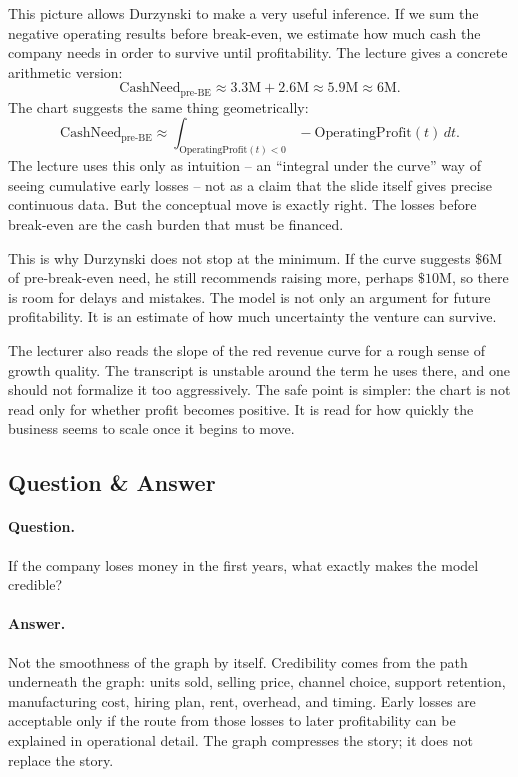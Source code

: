 This picture allows Durzynski to make a very useful inference. If we sum the negative operating results before break-even, we estimate how much cash the company needs in order to survive until profitability. The lecture gives a concrete arithmetic version:
\begin{equation}
\mathrm{CashNeed}_{\mathrm{pre\mbox{-}BE}} \approx 3.3\text{M} + 2.6\text{M}
\approx 5.9\text{M} \approx 6\text{M}.
\end{equation}
The chart suggests the same thing geometrically:
\begin{equation}
\mathrm{CashNeed}_{\mathrm{pre\mbox{-}BE}}
\approx
\int_{\mathrm{OperatingProfit}(t)<0}
-\mathrm{OperatingProfit}(t)\,dt.
\end{equation}
The lecture uses this only as intuition -- an ``integral under the curve'' way of seeing cumulative early losses -- not as a claim that the slide itself gives precise continuous data. But the conceptual move is exactly right. The losses before break-even are the cash burden that must be financed.

This is why Durzynski does not stop at the minimum. If the curve suggests \(\$6\text{M}\) of pre-break-even need, he still recommends raising more, perhaps \(\$10\text{M}\), so there is room for delays and mistakes. The model is not only an argument for future profitability. It is an estimate of how much uncertainty the venture can survive.

The lecturer also reads the slope of the red revenue curve for a rough sense of growth quality. The transcript is unstable around the term he uses there, and one should not formalize it too aggressively. The safe point is simpler: the chart is not read only for whether profit becomes positive. It is read for how quickly the business seems to scale once it begins to move.

\subsection{Question \& Answer}

\paragraph{Question.}
If the company loses money in the first years, what exactly makes the model credible?

\paragraph{Answer.}
Not the smoothness of the graph by itself. Credibility comes from the path underneath the graph: units sold, selling price, channel choice, support retention, manufacturing cost, hiring plan, rent, overhead, and timing. Early losses are acceptable only if the route from those losses to later profitability can be explained in operational detail. The graph compresses the story; it does not replace the story.

